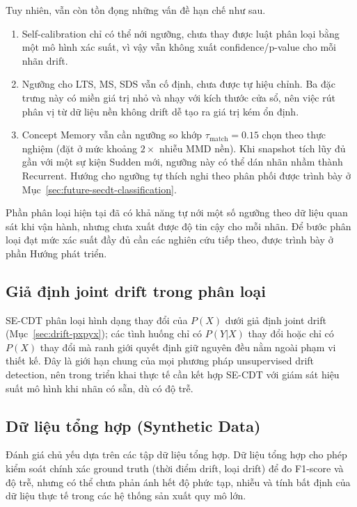 Tuy nhiên, vẫn còn tồn đọng những vấn đề hạn chế như sau.
\begin{enumerate}
	\item Self-calibration chỉ có thể nới ngưỡng, chưa thay được luật phân loại bằng một mô hình xác suất, vì vậy vẫn không xuất confidence/p-value cho mỗi nhãn drift.
	\item Ngưỡng cho LTS, MS, SDS vẫn cố định, chưa được tự hiệu chỉnh. Ba đặc trưng này có miền giá trị nhỏ và nhạy với kích thước cửa sổ, nên việc rút phân vị từ dữ liệu nền không drift dễ tạo ra giá trị kém ổn định.
	\item Concept Memory vẫn cần ngưỡng so khớp $\tau_{\text{match}} = 0.15$ chọn theo thực nghiệm (đặt ở mức khoảng $2\times$ nhiễu MMD nền). Khi snapshot tích lũy đủ gần với một sự kiện Sudden mới, ngưỡng này có thể dán nhãn nhầm thành Recurrent. Hướng cho ngưỡng tự thích nghi theo phân phối được trình bày ở Mục~\ref{sec:future-secdt-classification}.
\end{enumerate}
Phần phân loại hiện tại đã có khả năng tự nới một số ngưỡng theo dữ liệu quan sát khi vận hành, nhưng chưa xuất được độ tin cậy cho mỗi nhãn. Để bước phân loại đạt mức xác suất đầy đủ cần các nghiên cứu tiếp theo, được trình bày ở phần Hướng phát triển.

\subsection{Giả định joint drift trong phân loại}
\label{sec:limitation-joint-drift}
SE-CDT phân loại hình dạng thay đổi của $P(X)$ dưới giả định joint drift (Mục~\ref{sec:drift-pxpyx}); các tình huống chỉ có $P(Y|X)$ thay đổi hoặc chỉ có $P(X)$ thay đổi mà ranh giới quyết định giữ nguyên đều nằm ngoài phạm vi thiết kế. Đây là giới hạn chung của mọi phương pháp unsupervised drift detection, nên trong triển khai thực tế cần kết hợp SE-CDT với giám sát hiệu suất mô hình khi nhãn có sẵn, dù có độ trễ.

\subsection{Dữ liệu tổng hợp (Synthetic Data)}
Đánh giá chủ yếu dựa trên các tập dữ liệu tổng hợp. Dữ liệu tổng hợp cho phép kiểm soát chính xác ground truth (thời điểm drift, loại drift) để đo F1-score và độ trễ, nhưng có thể chưa phản ánh hết độ phức tạp, nhiễu và tính bất định của dữ liệu thực tế trong các hệ thống sản xuất quy mô lớn.

